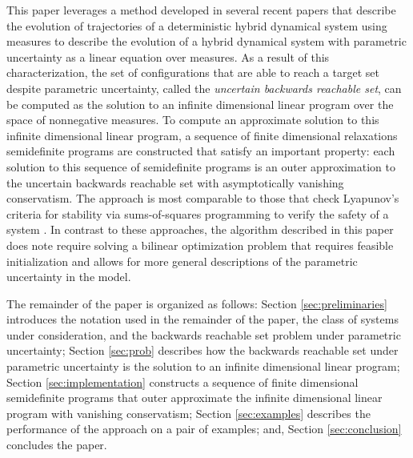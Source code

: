 This paper leverages a method developed in several recent papers \cite{henrion2014convex,majumdar2014convex,shia2014convex} that describe the evolution of trajectories of a deterministic hybrid dynamical system using measures to describe the evolution of a hybrid dynamical system with parametric uncertainty as a linear equation over measures.
As a result of this characterization, the set of configurations that are able to reach a target set despite parametric uncertainty, called the \emph{uncertain backwards reachable set}, can be computed as the solution to an infinite dimensional linear program over the space of nonnegative measures.
To compute an approximate solution to this infinite dimensional linear program, a sequence of finite dimensional relaxations semidefinite programs are constructed that satisfy an important property:
each solution to this sequence of semidefinite programs is an outer approximation to the uncertain backwards reachable set with asymptotically vanishing conservatism.
The approach is most comparable to those that check Lyapunov's criteria for stability via sums-of-squares programming to verify the safety of a system \cite{prajna2004safety}.
In contrast to these approaches, the algorithm described in this paper does note require solving a bilinear optimization problem that requires feasible initialization and allows for more general descriptions of the parametric uncertainty in the model.

The remainder of the paper is organized as follows:
Section \ref{sec:preliminaries} introduces the notation used in the remainder of the paper, the class of systems under consideration, and the backwards reachable set problem under parametric uncertainty;
Section \ref{sec:prob} describes how the backwards reachable set under parametric uncertainty is the solution to an infinite dimensional linear program;
Section \ref{sec:implementation} constructs a sequence of finite dimensional semidefinite programs that outer approximate the infinite dimensional linear program with vanishing conservatism;
Section \ref{sec:examples} describes the performance of the approach on a pair of examples;
and, Section \ref{sec:conclusion} concludes the paper.
